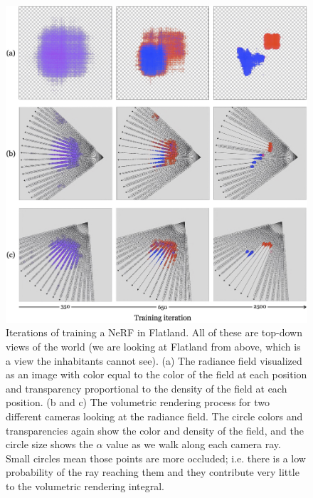 \begin{figure}[t]
    \centerline{
    \includegraphics[width=1.0\linewidth]{figures/nerfs/flatland_training.jpg}
    }
    \caption{Iterations of training a NeRF in Flatland. All of these are top-down views of the world (we are looking at Flatland from above, which is a view the inhabitants cannot see). (a) The radiance field visualized as an image with color equal to the color of the field at each position and transparency proportional to the density of the field at each position. (b and c) The volumetric rendering process for two different cameras looking at the radiance field. The circle colors and transparencies again show the color and density of the field, and the circle size shows the $\alpha$ value as we walk along each camera ray. Small circles mean those points are more occluded; i.e. there is a low probability of the ray reaching them and they contribute very little to the volumetric rendering integral.}
    \label{fig:nerfs:flatland_training}
\end{figure}

